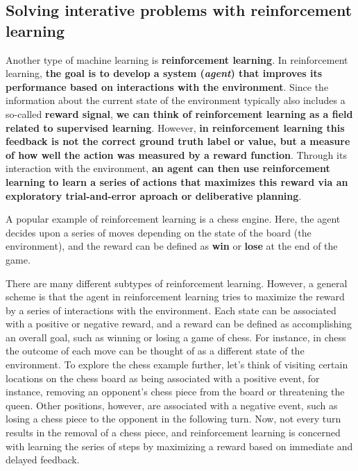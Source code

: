 \documentclass[11pt]{article}
\begin{document}
    

    \subsection{Solving interative problems with reinforcement
learning}\label{solving-interative-problems-with-reinforcement-learning}

    Another type of machine learning is \textbf{reinforcement learning}. In
reinforcement learning, \textbf{the goal is to develop a system
(\emph{agent}) that improves its performance based on interactions with
the environment}. Since the information about the current state of the
environment typically also includes a so-called \textbf{reward signal},
\textbf{we can think of reinforcement learning as a field related to
supervised learning}. However, \textbf{in reinforcement learning this
feedback is not the correct ground truth label or value, but a measure
of how well the action was measured by a reward function}. Through its
interaction with the environment, \textbf{an agent can then use
reinforcement learning to learn a series of actions that maximizes this
reward via an exploratory trial-and-error aproach or deliberative
planning}.

    A popular example of reinforcement learning is a chess engine. Here, the
agent decides upon a series of moves depending on the state of the board
(the environment), and the reward can be defined as \textbf{win} or
\textbf{lose} at the end of the game.

    

    There are many different subtypes of reinforcement learning. However, a
general scheme is that the agent in reinforcement learning tries to
maximize the reward by a series of interactions with the environment.
Each state can be associated with a positive or negative reward, and a
reward can be defined as accomplishing an overall goal, such as winning
or losing a game of chess. For instance, in chess the outcome of each
move can be thought of as a different state of the environment. To
explore the chess example further, let's think of visiting certain
locations on the chess board as being associated with a positive event,
for instance, removing an opponent's chess piece from the board or
threatening the queen. Other positions, however, are associated with a
negative event, such as losing a chess piece to the opponent in the
following turn. Now, not every turn results in the removal of a chess
piece, and reinforcement learning is concerned with learning the series
of steps by maximizing a reward based on immediate and delayed feedback.
\end{document}
